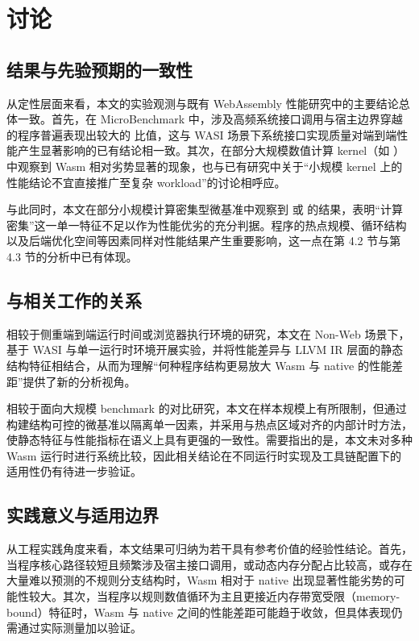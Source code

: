 \chapter{讨论}
\label{cha:discussion}


\section{结果与先验预期的一致性}

从定性层面来看，本文的实验观测与既有 WebAssembly 性能研究中的主要结论总体一致。首先，在 MicroBenchmark 中，涉及高频系统接口调用与宿主边界穿越的程序普遍表现出较大的  比值，这与 WASI 场景下系统接口实现质量对端到端性能产生显著影响的已有结论相一致\cite{mao2024ewapa}。其次，在部分大规模数值计算 kernel（如 ）中观察到 Wasm 相对劣势显著的现象，也与已有研究中关于“小规模 kernel 上的性能结论不宜直接推广至复杂 workload”的讨论相呼应\cite{jangda2021not}。

与此同时，本文在部分小规模计算密集型微基准中观察到  或  的结果，表明“计算密集”这一单一特征不足以作为性能优劣的充分判据。程序的热点规模、循环结构以及后端优化空间等因素同样对性能结果产生重要影响，这一点在第 4.2 节与第 4.3 节的分析中已有体现。

\section{与相关工作的关系}

相较于侧重端到端运行时间或浏览器执行环境的研究\cite{sunarto2023systematic,yan2021understanding}，本文在 Non-Web 场景下，基于 WASI 与单一运行时环境开展实验，并将性能差异与 LLVM IR 层面的静态结构特征相结合，从而为理解“何种程序结构更易放大 Wasm 与 native 的性能差距”提供了新的分析视角。

相较于面向大规模 benchmark 的对比研究\cite{jangda2021not}，本文在样本规模上有所限制，但通过构建结构可控的微基准以隔离单一因素，并采用与热点区域对齐的内部计时方法，使静态特征与性能指标在语义上具有更强的一致性。需要指出的是，本文未对多种 Wasm 运行时进行系统比较，因此相关结论在不同运行时实现及工具链配置下的适用性仍有待进一步验证。

\section{实践意义与适用边界}

从工程实践角度来看，本文结果可归纳为若干具有参考价值的经验性结论。首先，当程序核心路径较短且频繁涉及宿主接口调用，或动态内存分配占比较高，或存在大量难以预测的不规则分支结构时，Wasm 相对于 native 出现显著性能劣势的可能性较大。其次，当程序以规则数值循环为主且更接近内存带宽受限（memory-bound）特征时，Wasm 与 native 之间的性能差距可能趋于收敛，但具体表现仍需通过实际测量加以验证。


